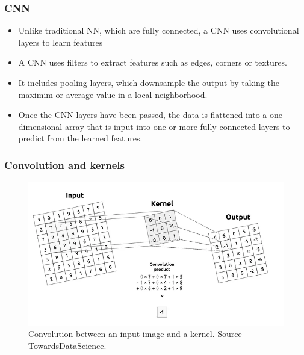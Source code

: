 \documentclass{beamer}
\begin{document}
\begin{frame}
    \frametitle{CNN}
    \begin{itemize}
        \item Unlike traditional NN, which are fully connected, a CNN uses convolutional layers to learn features
        \item A CNN uses filters to extract features such as edges, corners or textures.
        \item It includes pooling layers, which downsample the output by taking the maximim or average value in a local neighborhood.
        \item Once the CNN layers have been passed, the data is flattened into a one-dimensional array that is input into one or more fully connected layers to predict from the learned features.
    \end{itemize}


    
\end{frame}

\begin{frame}
    \frametitle{Convolution and kernels}

    \begin{figure}[h]
        \centering
        \includegraphics[width=\linewidth]{convolution.png}
        \caption{Convolution between an input image and a kernel. Source \href{https://towardsdatascience.com/conv2d-to-finally-understand-what-happens-in-the-forward-pass-1bbaafb0b148}{TowardsDataScience}.}
        \label{<label>}
    \end{figure}

\end{frame}
\end{document}
